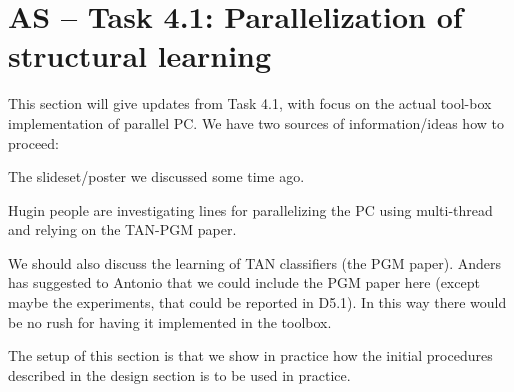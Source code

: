 

\section{AS -- Task 4.1: Parallelization of structural learning}\label{sec:parallel}



This section will give updates from Task 4.1, with focus on the actual tool-box implementation of parallel PC. We have two sources of information/ideas how to proceed: 
\bit
\item The slideset/poster we discussed some time ago.
\item Hugin people are investigating lines for parallelizing the PC using  multi-thread and relying on the TAN-PGM paper.
\eit

We should also discuss the learning of TAN classifiers (the PGM paper). Anders has suggested to Antonio that we could include the PGM paper here (except maybe the experiments, that could be reported in D5.1).
In this way there would be no rush for having it implemented in the toolbox.

The setup of this section is that we show in practice how the initial procedures described in the design section is to be used in practice.